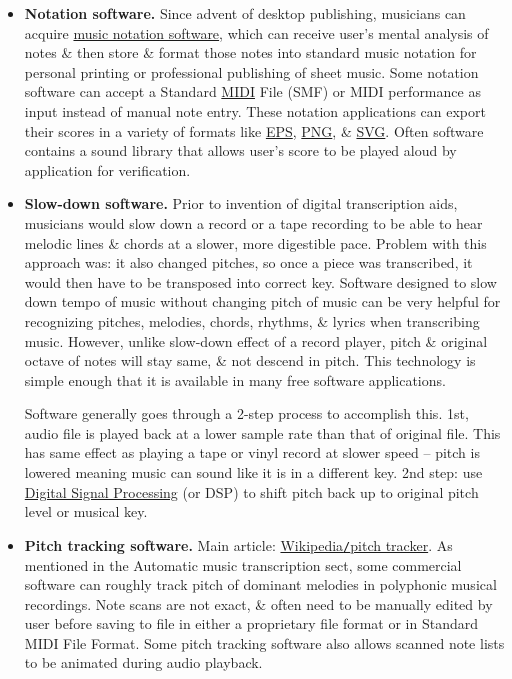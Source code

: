 \documentclass{article}
\begin{document}
\begin{itemize}
	\item {\bf Notation software.} Since advent of desktop publishing, musicians can acquire \href{https://en.wikipedia.org/wiki/Music_notation_software}{music notation software}, which can receive user's mental analysis of notes \& then store \& format those notes into standard music notation for personal printing or professional publishing of sheet music. Some notation software can accept a Standard \href{https://en.wikipedia.org/wiki/MIDI}{MIDI} File (SMF) or MIDI performance as input instead of manual note entry. These notation applications can export their scores in a variety of formats like \href{https://en.wikipedia.org/wiki/Encapsulated_PostScript}{EPS}, \href{https://en.wikipedia.org/wiki/Portable_Network_Graphics}{PNG}, \& \href{https://en.wikipedia.org/wiki/Scalable_Vector_Graphics}{SVG}. Often software contains a sound library that allows user's score to be played aloud by application for verification.
	\item {\bf Slow-down software.} Prior to invention of digital transcription aids, musicians would slow down a record or a tape recording to be able to hear melodic lines \& chords at a slower, more digestible pace. Problem with this approach was: it also changed pitches, so once a piece was transcribed, it would then have to be transposed into correct key. Software designed to slow down tempo of music without changing pitch of music can be very helpful for recognizing pitches, melodies, chords, rhythms, \& lyrics when transcribing music. However, unlike slow-down effect of a record player, pitch \& original octave of notes will stay same, \& not descend in pitch. This technology is simple enough that it is available in many free software applications.
	
	Software generally goes through a 2-step process to accomplish this. 1st, audio file is played back at a lower sample rate than that of original file. This has same effect as playing a tape or vinyl record at slower speed -- pitch is lowered meaning music can sound like it is in a different key. 2nd step: use \href{https://en.wikipedia.org/wiki/Digital_signal_processing}{Digital Signal Processing} (or DSP) to shift pitch back up to original pitch level or musical key.
	\item {\bf Pitch tracking software.} Main article: \href{https://en.wikipedia.org/wiki/Pitch_tracker}{Wikipedia{\tt/}pitch tracker}. As mentioned in the Automatic music transcription sect, some commercial software can roughly track pitch of dominant melodies in polyphonic musical recordings. Note scans are not exact, \& often need to be manually edited by user before saving to file in either a proprietary file format or in Standard MIDI File Format. Some pitch tracking software also allows scanned note lists to be animated during audio playback.
\end{itemize}
\end{document}

